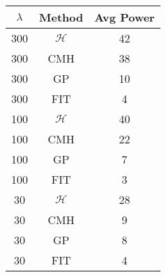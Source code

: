 \centering \begin{tabular}{c|c|c}
$\lambda$	&Method	&Avg Power\\\hline
300	&$\mathcal{H}$	&42\\
300	&CMH	&38\\
300	&GP	&10\\
300	&FIT	&4\\
100	&$\mathcal{H}$	&40\\
100	&CMH	&22\\
100	&GP	&7\\
100	&FIT	&3\\
30	&$\mathcal{H}$	&28\\
30	&CMH	&9\\
30	&GP	&8\\
30	&FIT	&4\\
\end{tabular}

